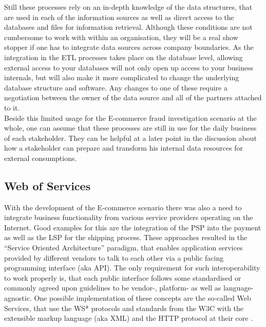 Still these processes rely on an in-depth knowledge of the data structures, that are used in each of the information sources as well as direct access to the databases and files for information retrieval. Although these conditions are not cumbersome to work with within an organisation, they will be a real show stopper if one has to integrate data sources across company boundaries. As the integration in the \gls{ETL} processes takes place on the database level, allowing external access to your databases will not only open up access to your business internals, but will also make it more complicated to change the underlying database structure and software. Any changes to one of these require a negotiation between the owner of the data source and all of the partners attached to it. \\

Beside this limited usage for the E-commerce fraud investigation scenario at the whole, one can assume that these processes are still in use for the daily business of each stakeholder. They can be helpful at a later point in the discussion about how a stakeholder can prepare and transform his internal data resources for external consumptions.


\subsection{Web of Services}
\label{subsec:web_services}

With the development of the E-commerce scenario there was also a need to integrate business functionality from various service providers operating on the Internet. Good examples for this are the integration of the \gls{PSP} into the payment as well as the \gls{LSP} for the shipping process. These approaches resulted in the ``Service Oriented Architecture'' paradigm, that enables application services provided by different vendors to talk to each other via a public facing programming interface (aka \gls{API}). The only requirement for such interoperability to work properly is, that each public interface follows some standardised or commonly agreed upon guidelines to be vendor-, platform- as well as language-agnostic. One possible implementation of these concepts are the so-called Web Services, that use the WS* protocols and standards from the \gls{W3C} with the extensible markup language (aka \gls{XML}) and the \gls{HTTP} protocol at their core \citep{josuttis2007soa}. \\

